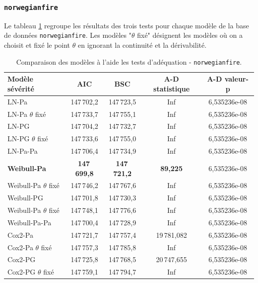 		\subsubsection{\texttt{norwegianfire}} 
		\begin{sloppypar}Le tableau \ref{TAB_TestGOF_NF} regroupe les résultats des trois tests pour chaque modèle de la base de données \texttt{norwegianfire}. Les modèles "$\theta$ fixé" désignent les modèles où on a choisit et fixé le point $\theta$ en ignorant la continuité et la dérivabilité. 
		\end{sloppypar}
		\begin{table}[H]
			\begin{center}
				\begin{tabular}{|l|cccc|}
					\hline
					Modèle sévérité          &         AIC         &         BSC         & A-D statistique & A-D valeur-p \\ \hline
					LN-Pa                    &     147\,702,2      &     147\,723,5      &       Inf       & 6,535236e-08 \\
					LN-Pa $\theta$ fixé      &     147\,733,7      &     147\,755,1      &       Inf       & 6,535236e-08 \\
					LN-PG                    &     147\,704,2      &     147\,732,7      &       Inf       & 6,535236e-08 \\
					LN-PG $\theta$ fixé      &     147\,733,6      &     147\,755,0      &       Inf       & 6,535236e-08 \\
					LN-Pa-Pa                 &     147\,706,4      &     147\,734,9      &       Inf       & 6,535236e-08 \\
					\textbf{Weibull-Pa }     & \textbf{147\,699,8} & \textbf{147\,721,2} & \textbf{89,225} & 6,535236e-08 \\
					Weibull-Pa $\theta$ fixé &     147\,746,2      &     147\,767,6      &       Inf       & 6,535236e-08 \\
					Weibull-PG               &     147\,701,8      &     147\,730,3      &       Inf       & 6,535236e-08 \\
					Weibull-Pa $\theta$ fixé &     147\,748,1      &     147\,776,6      &       Inf       & 6,535236e-08 \\
					Weibull-Pa-Pa            &     147\,700,4      &     147\,728,9      &       Inf       & 6,535236e-08 \\
					Cox2-Pa                  &     147\,721,7      &     147\,757,4      &   19\,781,082   & 6,535236e-08 \\
					Cox2-Pa $\theta$ fixé    &     147\,757,3      &     147\,785,8      &       Inf       & 6,535236e-08 \\
					Cox2-PG                  &     147\,725,8      &     147\,768,5      &   20\,747,655   & 6,535236e-08 \\
					Cox2-PG $\theta$ fixé    &     147\,759,1      &     147\,794,7      &       Inf       & 6,535236e-08 \\ \hline
				\end{tabular}
			\renewcommand{\tablename}{Tableau}
			\caption{Comparaison des modèles à l'aide les tests d'adéquation - \texttt{norwegianfire}.}\label{TAB_TestGOF_NF}
			\end{center}
		\end{table}
